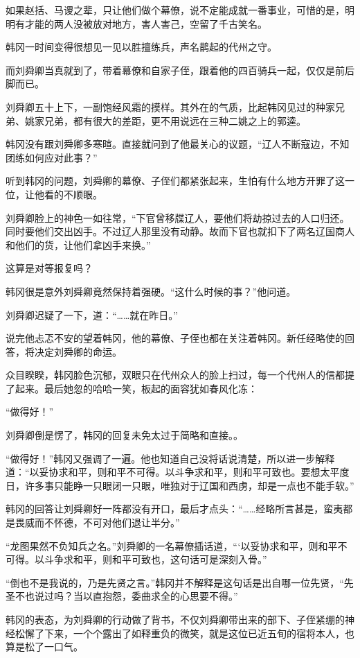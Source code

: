 如果赵括、马谡之辈，只让他们做个幕僚，说不定能成就一番事业，可惜的是，明明有才能的两人没被放对地方，害人害己，空留了千古笑名。

韩冈一时间变得很想见一见以胜擅练兵，声名鹊起的代州之守。

而刘舜卿当真就到了，带着幕僚和自家子侄，跟着他的四百骑兵一起，仅仅是前后脚而已。

刘舜卿五十上下，一副饱经风霜的摸样。其外在的气质，比起韩冈见过的种家兄弟、姚家兄弟，都有很大的差距，更不用说远在三种二姚之上的郭逵。

韩冈没有跟刘舜卿多寒暄。直接就问到了他最关心的议题，“辽人不断寇边，不知团练如何应对此事？”

听到韩冈的问题，刘舜卿的幕僚、子侄们都紧张起来，生怕有什么地方开罪了这一位，让他看的不顺眼。

刘舜卿脸上的神色一如往常，“下官曾移牒辽人，要他们将劫掠过去的人口归还。同时要他们交出凶手。不过辽人那里没有动静。故而下官也就扣下了两名辽国商人和他们的货，让他们拿凶手来换。”

这算是对等报复吗？

韩冈很是意外刘舜卿竟然保持着强硬。“这什么时候的事？”他问道。

刘舜卿迟疑了一下，道：“……就在昨日。”

说完他忐忑不安的望着韩冈，他的幕僚、子侄也都在关注着韩冈。新任经略使的回答，将决定刘舜卿的命运。

众目睽睽，韩冈脸色沉郁，双眼只在代州众人的脸上扫过，每一个代州人的信都提了起来。最后她忽的哈哈一笑，板起的面容犹如春风化冻：

“做得好！”

刘舜卿倒是愣了，韩冈的回复未免太过于简略和直接。。

“做得好！”韩冈又强调了一遍。他也知道自己没将话说清楚，所以进一步解释道：“以妥协求和平，则和平不可得。以斗争求和平，则和平可致也。要想太平度日，许多事只能睁一只眼闭一只眼，唯独对于辽国和西虏，却是一点也不能手软。”

韩冈的回答让刘舜卿好一阵都没有开口，最后才点头：“……经略所言甚是，蛮夷都是畏威而不怀德，不可对他们退让半分。”

“龙图果然不负知兵之名。”刘舜卿的一名幕僚插话道，“‘以妥协求和平，则和平不可得。以斗争求和平，则和平可致也，这句话可是深刻入骨。”

“倒也不是我说的，乃是先贤之言。”韩冈并不解释是这句话是出自哪一位先贤，“先圣不也说过吗？当以直抱怨，委曲求全的心思要不得。”

韩冈的表态，为刘舜卿的行动做了背书，不仅刘舜卿带出来的部下、子侄紧绷的神经松懈了下来，一个个露出了如释重负的微笑，就是这位已近五旬的宿将本人，也算是松了一口气。

